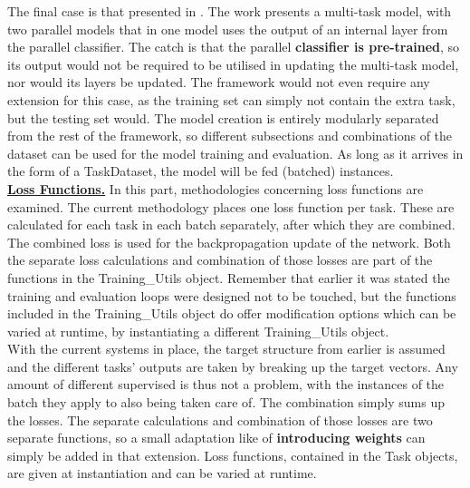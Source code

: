 The final case is that presented in \cite{wu2020domain}. The work presents a multi-task model, with two parallel models that in one model uses the output of an internal layer from the parallel classifier. The catch is that the parallel \textbf{classifier is pre-trained}, so its output would not be required to be utilised in updating the multi-task model, nor would its layers be updated. The framework would not even require any extension for this case, as the training set can simply not contain the extra task, but the testing set would. The model creation is entirely modularly separated from the rest of the framework, so different subsections and combinations of the dataset can be used for the model training and evaluation. As long as it arrives in the form of a TaskDataset, the model will be fed (batched) instances.\\


\underline{\textbf{Loss Functions.}} In this part, methodologies concerning loss functions are examined. The current methodology places one loss function per task. These are calculated for each task in each batch separately, after which they are combined. The combined loss is used for the backpropagation update of the network. Both the separate loss calculations and combination of those losses are part of the functions in the Training\_Utils object. Remember that earlier it was stated the training and evaluation loops were designed not to be touched, but the functions included in the Training\_Utils object do offer modification options which can be varied at runtime, by instantiating a different Training\_Utils object. \\

With the current systems in place, the target structure from earlier is assumed and the different tasks' outputs are taken by breaking up the target vectors. Any amount of different supervised is thus not a problem, with the instances of the batch they apply to also being taken care of. The combination simply sums up the losses. The separate calculations and combination of those losses are two separate functions, so a small adaptation like \cite{park2020augmenting} of \textbf{introducing weights} can simply be added in that extension. Loss functions, contained in the Task objects, are given at instantiation and can be varied at runtime.\\

